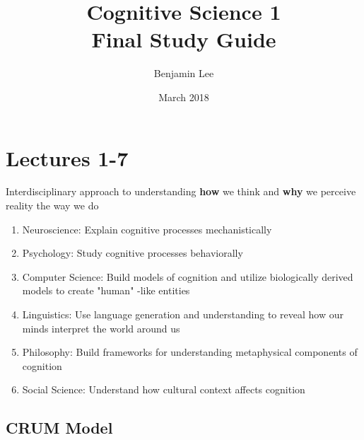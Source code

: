\documentclass{article}
\title{Cognitive Science 1 \\ Final Study Guide}
\author{Benjamin Lee}
\date{March 2018}
\begin{document}
\maketitle

\section{Lectures 1-7}
Interdisciplinary approach to understanding \textbf{how} we think and \textbf{why} we perceive reality the way we do  \\

\begin{enumerate}
    \item Neuroscience: Explain cognitive processes mechanistically
    \item Psychology: Study cognitive processes behaviorally
    \item Computer Science: Build models of cognition and utilize biologically derived models to create "human" -like entities
    \item Linguistics: Use language generation and understanding to reveal how our minds interpret the world around us
    \item Philosophy: Build frameworks for understanding metaphysical components of cognition
    \item Social Science: Understand how cultural context affects cognition
\end{enumerate}

\subsection{CRUM Model}
\end{document}
